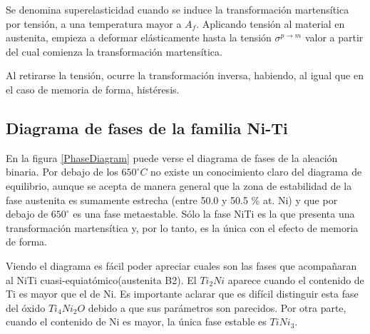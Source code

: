 \documentclass[12pt]{article}
\theoremstyle{definition}
\theoremstyle{remark}
\begin{document}
Se denomina superelasticidad cuando se induce la transformación martensítica por tensión, a una temperatura mayor a $A_f$. Aplicando tensión al material en austenita, empieza a deformar elásticamente hasta la tensión $\sigma^{p \rightarrow m}$ valor a partir del cual comienza la transformación martensítica.

Al retirarse la tensión, ocurre la transformación inversa, habiendo, al igual que en el caso de memoria de forma, histéresis.


\subsection{Diagrama de fases de la familia Ni-Ti}

En la figura \ref{PhaseDiagram} puede verse el diagrama de fases de la aleación binaria. Por debajo de los $650 ^\circ C$ no existe un conocimiento claro del diagrama de equilibrio, aunque se acepta de manera general que la zona de estabilidad de la fase austenita es sumamente estrecha (entre 50.0 y 50.5 \% at. Ni) y que por debajo de $650^\circ$ es una fase metaestable. Sólo la fase NiTi es la que presenta una transformación martensítica y, por lo tanto, es la única con el efecto de memoria de forma.

Viendo el diagrama es fácil poder apreciar cuales son las fases que acompañaran al NiTi cuasi-equiatómico(austenita B2). El $Ti_2Ni$ aparece cuando el contenido de Ti es mayor que el de Ni. Es importante aclarar que es difícil distinguir esta fase del óxido $Ti_4Ni_2O$ debido a que sus parámetros son parecidos. Por otra parte, cuando el contenido de Ni es mayor, la única fase estable es $TiNi_3$.
\end{document}
